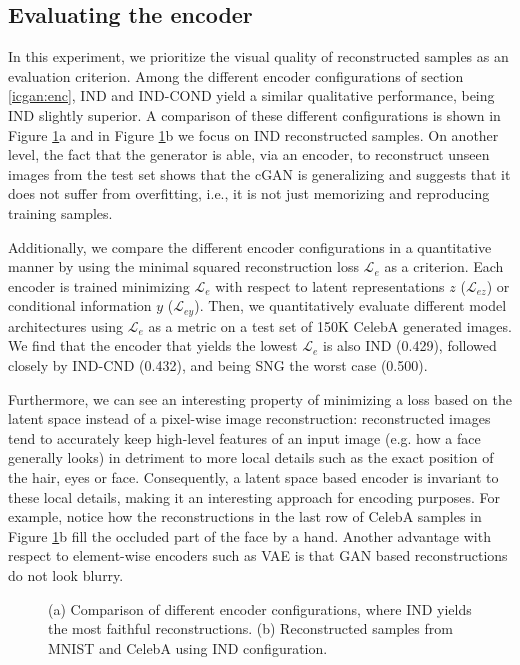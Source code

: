 \documentclass{article}
\begin{document}
\subsection{Evaluating the encoder} \label{exp:enc_eval}
In this experiment, we prioritize the visual quality of reconstructed samples as an evaluation criterion. Among the different encoder configurations of section \ref{icgan:enc}, IND and IND-COND yield a similar qualitative performance, being IND slightly superior. A comparison of these different configurations is shown in Figure \ref{fig:encoder_samples}a and in Figure \ref{fig:encoder_samples}b we focus on IND reconstructed samples. 
On another level, the fact that the generator is able, via an encoder, to reconstruct unseen images from the test set shows that the cGAN is generalizing and suggests that it does not suffer from overfitting, i.e., it is not just memorizing and reproducing training samples. 

Additionally, we compare the different encoder configurations in a quantitative manner by using the minimal squared reconstruction loss $\mathcal{L}_e$ as a criterion. Each encoder is trained minimizing $\mathcal{L}_{e}$ with respect to latent representations $z$ ($\mathcal{L}_{ez}$) or conditional information $y$ ($\mathcal{L}_{ey}$). Then, we quantitatively evaluate different model architectures using $\mathcal{L}_e$ as a metric on a test set of 150K CelebA generated images. We find that the encoder that yields the lowest $\mathcal{L}_e$ is also IND (0.429), followed closely by IND-CND (0.432), and being SNG the worst case (0.500). 

Furthermore, we can see an interesting property of minimizing a loss based on the latent space instead of a pixel-wise image reconstruction: reconstructed images tend to accurately keep high-level features of an input image (e.g. how a face generally looks) in detriment to more local details such as the exact position of the hair, eyes or face. Consequently, a latent space based encoder is invariant to these local details, making it an interesting approach for encoding purposes. For example, notice how the reconstructions in the last row of CelebA samples in Figure \ref{fig:encoder_samples}b fill the occluded part of the face by a hand. Another advantage with respect to element-wise encoders such as VAE is that GAN based reconstructions do not look blurry.


\begin{figure}[t]
        \centering
        \qquad
        \caption{(a) Comparison of different encoder configurations, where IND yields the most faithful reconstructions. (b) Reconstructed samples from MNIST and CelebA using IND configuration.}
        \label{fig:encoder_samples}
\end{figure}
\end{document}
